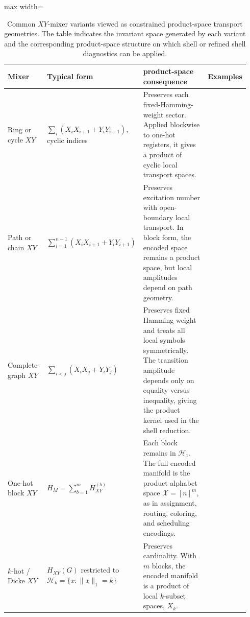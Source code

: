 \documentclass[a4paper,onecolumn,11pt,unpublished]{quantumarticle}
\theoremstyle{remark}
\begin{document}
\begin{table}[H]
\centering
\footnotesize
\setlength{\tabcolsep}{3pt}
\renewcommand{\arraystretch}{1.18}
\caption{Common \(XY\)-mixer variants viewed as constrained product-space
transport geometries. The table indicates the invariant space generated by each
variant and the corresponding product-space structure on which shell or refined
shell diagnostics can be applied.}
\label{tab:xy-mixer-variants-product spaces}
\begin{adjustbox}{max width=\textwidth}
\begin{tabular}{
@{}
>{\raggedright\arraybackslash}p{0.13\linewidth}
>{\raggedright\arraybackslash}p{0.22\linewidth}
>{\raggedright\arraybackslash}p{0.49\linewidth}
>{\raggedright\arraybackslash}p{0.10\linewidth}
@{}}
\toprule
\textbf{Mixer} &
\textbf{Typical form} &
\textbf{product-space consequence} &
\textbf{Examples} \\
\midrule

Ring or cycle \(XY\) &
\(\sum_i (X_iX_{i+1}+Y_iY_{i+1})\), cyclic indices &
Preserves each fixed-Hamming-weight sector. Applied blockwise to one-hot
registers, it gives a product of cyclic local transport spaces. &
\cite{Hadfield2019AOA,Wang2020XYMixers,Cook2019MaxKVertexCover} \\

Path or chain \(XY\) &
\(\sum_{i=1}^{n-1}(X_iX_{i+1}+Y_iY_{i+1})\) &
Preserves excitation number with open-boundary local transport. In block form,
the encoded space remains a product space, but local amplitudes depend on path
geometry. &
\cite{He2023A,KordonowyLeipold2026XYLie} \\

Complete-graph \(XY\) &
\(\sum_{i<j}(X_iX_j+Y_iY_j)\) &
Preserves fixed Hamming weight and treats all local symbols symmetrically. The transition amplitude depends only on equality versus inequality, giving the product kernel used in the shell reduction. &
\cite{Cook2019MaxKVertexCover,Hadfield2019AOA,KordonowyLeipold2026XYLie} \\

One-hot block \(XY\) &
\(H_M=\sum_{b=1}^m H_{XY}^{(b)}\) &
Each block remains in \(\mathcal H_1\). The full encoded manifold is the
product alphabet space \(\mathcal X=[n]^m\), as in assignment, routing, coloring, and
scheduling encodings. &
\cite{Hadfield2019AOA,onahce} \\

\(k\)-hot / Dicke \(XY\) &
\(H_{XY}(G)\) restricted to \(\mathcal H_k=\{x:\|x\|_1=k\}\) &
Preserves cardinality. With \(m\) blocks, the encoded manifold is a product of
local \(k\)-subset spaces, \(X_k\). &
\cite{Cook2019MaxKVertexCover,B_rtschi_2019} \\


\end{tabular}
\end{adjustbox}
\end{table}
\end{document}
